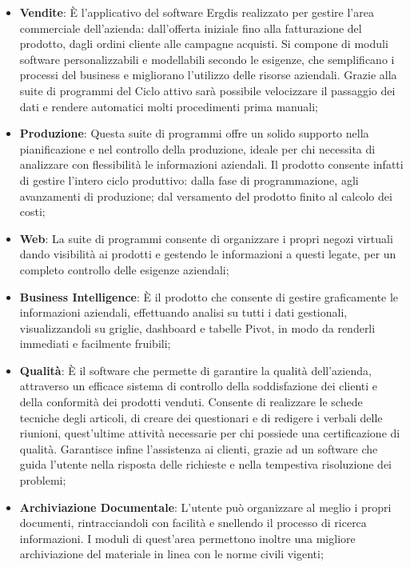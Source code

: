 \begin{itemize}
	\item \textbf{Vendite}: È l’applicativo del software Ergdis realizzato per gestire l’area commerciale dell’azienda: dall’offerta iniziale fino alla fatturazione del prodotto, dagli ordini cliente alle campagne acquisti. Si compone di moduli software personalizzabili e modellabili secondo le esigenze, che semplificano i processi del business e migliorano l’utilizzo delle risorse aziendali. Grazie alla suite di programmi del Ciclo attivo sarà possibile velocizzare il passaggio dei dati e rendere automatici molti procedimenti prima manuali;
	
	\item \textbf{Produzione}: Questa suite di programmi offre un solido supporto nella pianificazione e nel controllo della produzione, ideale per chi necessita di analizzare con flessibilità le informazioni aziendali. Il prodotto consente infatti di gestire l’intero ciclo produttivo: dalla fase di programmazione, agli avanzamenti di produzione; dal versamento del prodotto finito al calcolo dei costi;
	
	\item \textbf{Web}: La suite di programmi consente di organizzare i propri negozi virtuali dando visibilità ai prodotti e gestendo le informazioni a questi legate, per un completo controllo delle esigenze aziendali;
	
	\item \textbf{Business Intelligence}: È il prodotto che consente di gestire graficamente le informazioni aziendali, effettuando analisi su tutti i dati gestionali, visualizzandoli su griglie, dashboard e tabelle Pivot, in modo da renderli immediati e facilmente fruibili;
	
	\item \textbf{Qualità}: È il software che permette di garantire la qualità dell’azienda, attraverso un efficace sistema di controllo della soddisfazione dei clienti e della conformità dei prodotti venduti. Consente di realizzare le schede tecniche degli articoli, di creare dei questionari e di redigere i verbali delle riunioni, quest’ultime attività necessarie per chi possiede una certificazione di qualità. Garantisce infine l'assistenza ai clienti, grazie ad un software che guida l’utente nella risposta delle richieste e nella tempestiva risoluzione dei problemi;
	
	\item \textbf{Archiviazione Documentale}: L'utente può organizzare al meglio i propri documenti, rintracciandoli con facilità e snellendo il processo di ricerca informazioni. I moduli di quest'area permettono inoltre una migliore archiviazione del materiale in linea con le norme civili vigenti;
	

\end{itemize}
